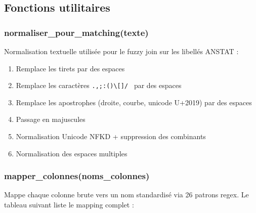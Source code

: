 \documentclass[12pt,a4paper,french]{report}
\begin{document}
\subsection{Fonctions utilitaires}

\subsubsection{normaliser\_pour\_matching(texte)}

Normalisation textuelle utilisée pour le fuzzy join sur les libellés ANSTAT :
\begin{enumerate}[nosep]
  \item Remplace les tirets par des espaces
  \item Remplace les caractères \texttt{.,;:()\textbackslash[]/ } par des
        espaces
  \item Remplace les apostrophes (droite, courbe, unicode U+2019) par des
        espaces
  \item Passage en majuscules
  \item Normalisation Unicode NFKD + suppression des combinants
  \item Normalisation des espaces multiples
\end{enumerate}

\subsubsection{mapper\_colonnes(noms\_colonnes)}

Mappe chaque colonne brute vers un nom standardisé via 26 patrons regex.
Le tableau suivant liste le mapping complet :
\end{document}
